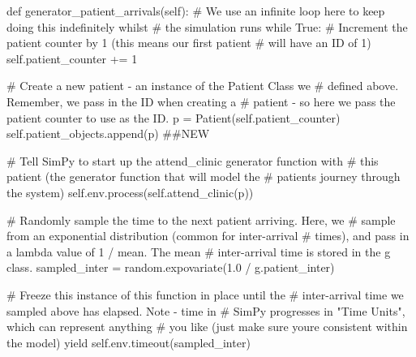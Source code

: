 \documentclass[
  letterpaper,
  DIV=11,
  numbers=noendperiod]{scrreprt}
\newenvironment{Shaded}{}{}
\newcommand{\CommentTok}[1]{\textcolor[rgb]{0.42,0.45,0.49}{#1}}
\newcommand{\ControlFlowTok}[1]{\textcolor[rgb]{0.84,0.23,0.29}{#1}}
\newcommand{\DecValTok}[1]{\textcolor[rgb]{0.00,0.36,0.77}{#1}}
\newcommand{\FloatTok}[1]{\textcolor[rgb]{0.00,0.36,0.77}{#1}}
\newcommand{\KeywordTok}[1]{\textcolor[rgb]{0.84,0.23,0.29}{#1}}
\newcommand{\NormalTok}[1]{\textcolor[rgb]{0.14,0.16,0.18}{#1}}
\newcommand{\OperatorTok}[1]{\textcolor[rgb]{0.14,0.16,0.18}{#1}}
\newcommand{\VariableTok}[1]{\textcolor[rgb]{0.89,0.38,0.04}{#1}}
\begin{document}
\begin{Shaded}
\begin{Highlighting}[]
\KeywordTok{def}\NormalTok{ generator\_patient\_arrivals(}\VariableTok{self}\NormalTok{):}
        \CommentTok{\# We use an infinite loop here to keep doing this indefinitely whilst}
        \CommentTok{\# the simulation runs}
        \ControlFlowTok{while} \VariableTok{True}\NormalTok{:}
            \CommentTok{\# Increment the patient counter by 1 (this means our first patient}
            \CommentTok{\# will have an ID of 1)}
            \VariableTok{self}\NormalTok{.patient\_counter }\OperatorTok{+=} \DecValTok{1}

            \CommentTok{\# Create a new patient {-} an instance of the Patient Class we}
            \CommentTok{\# defined above.  Remember, we pass in the ID when creating a}
            \CommentTok{\# patient {-} so here we pass the patient counter to use as the ID.}
\NormalTok{            p }\OperatorTok{=}\NormalTok{ Patient(}\VariableTok{self}\NormalTok{.patient\_counter)}
            \VariableTok{self}\NormalTok{.patient\_objects.append(p) }\CommentTok{\#\#NEW}

            \CommentTok{\# Tell SimPy to start up the attend\_clinic generator function with}
            \CommentTok{\# this patient (the generator function that will model the}
            \CommentTok{\# patient\textquotesingle{}s journey through the system)}
            \VariableTok{self}\NormalTok{.env.process(}\VariableTok{self}\NormalTok{.attend\_clinic(p))}

            \CommentTok{\# Randomly sample the time to the next patient arriving.  Here, we}
            \CommentTok{\# sample from an exponential distribution (common for inter{-}arrival}
            \CommentTok{\# times), and pass in a lambda value of 1 / mean.  The mean}
            \CommentTok{\# inter{-}arrival time is stored in the g class.}
\NormalTok{            sampled\_inter }\OperatorTok{=}\NormalTok{ random.expovariate(}\FloatTok{1.0} \OperatorTok{/}\NormalTok{ g.patient\_inter)}

            \CommentTok{\# Freeze this instance of this function in place until the}
            \CommentTok{\# inter{-}arrival time we sampled above has elapsed.  Note {-} time in}
            \CommentTok{\# SimPy progresses in "Time Units", which can represent anything}
            \CommentTok{\# you like (just make sure you\textquotesingle{}re consistent within the model)}
            \ControlFlowTok{yield} \VariableTok{self}\NormalTok{.env.timeout(sampled\_inter)}
\end{Highlighting}
\end{Shaded}
\end{document}
